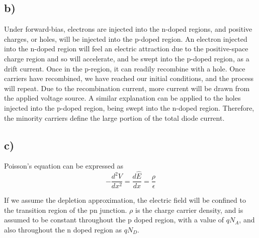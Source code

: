 \subsection*{b)}
	Under forward-bias, electrons are injected into the n-doped regions, and positive charges, or holes, 
	will be injected into the p-doped region. An electron injected into the n-doped region will feel an electric attraction due to the positive-space charge region and so will accelerate, and be swept into the p-doped region, as a drift current. Once in the p-region, it can readily recombine with a hole. Once carriers have recombined, we have reached our initial conditions, and the process will repeat. Due to the recombination current, more current will be drawn from the applied voltage source. A similar explanation can be applied to the holes injected into the p-doped region, being swept into the n-doped region. Therefore, the minority carriers define the large portion of the total diode current.
\subsection*{c)}
	Poisson's equation can be expressed as
	$$-\dfrac{d^2 V}{d x^2} = \dfrac{d\hat{E}}{dx} = \frac{\rho}{\epsilon} %
	$$
	
	If we assume the depletion approximation, the electric field will be confined to the transition region of the pn junction. $\rho$ is the charge carrier density, and is assumed to be constant throughout the p doped region, with a value of $q N_A$, and also throughout the n doped region as $q N_D$.
	
